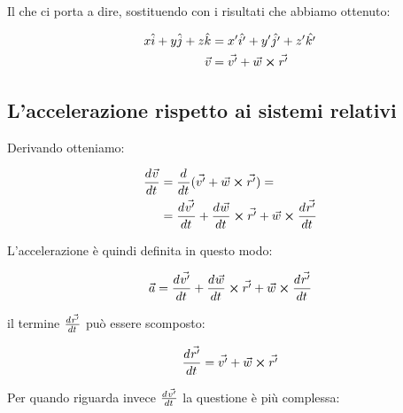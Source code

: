 Il che ci porta a dire, sostituendo con i risultati che abbiamo ottenuto:

\begin{equation}
  \begin{split} \label{eq:moti_relativi_velocity}
    x\uvec{i} + y\uvec{j} + z\uvec{k} &= x'\uvec{i'} + y'\uvec{j'} + z'\uvec{k'} \\
    \vec{v} &= \vec{v'} + \vec{w} \crossproduct \vec{r'}
  \end{split}
\end{equation}

\subsection{L'accelerazione rispetto ai sistemi relativi}

Derivando  otteniamo:

\begin{align*}
  \der{\vec{v}}{t}
   & = \der{}{t} (\vec{v'} + \vec{w} \crossproduct \vec{r'}) =                                               \\
   & = \der{\vec{v'}}{t} + \der{\vec{w}}{t} \crossproduct \vec{r'} + \vec{w} \crossproduct \der{\vec{r'}}{t}
\end{align*}

L'accelerazione è quindi definita in questo modo:

\begin{equation}
  \vec{a} = \der{\vec{v'}}{t} + \der{\vec{w}}{t} \crossproduct \vec{r'} + \vec{w} \crossproduct \der{\vec{r'}}{t}
\end{equation}

il termine $\frac{d^{} \vec{r'}}{d t^{}}$ può essere scomposto:

\begin{equation}
  \der{\vec{r'}}{t} = \vec{v'} + \vec{w} \crossproduct \vec{r'}
\end{equation}

Per quando riguarda invece $\frac{d^{} \vec{v'}}{d t^{}}$ la questione è più complessa:

